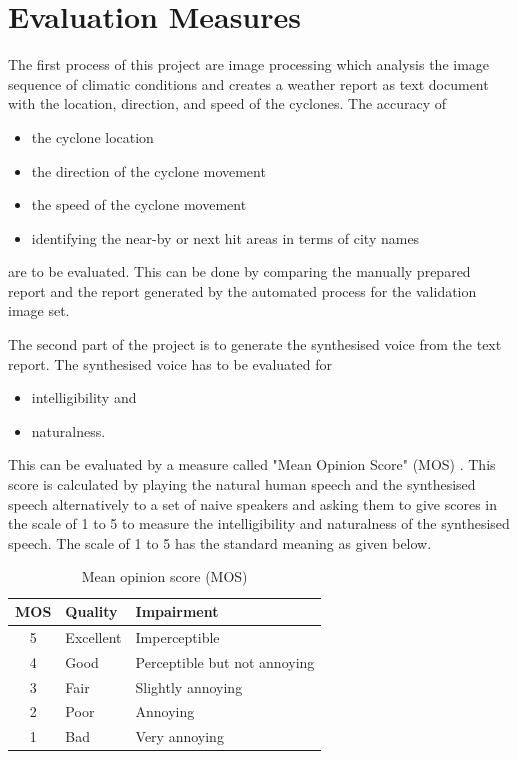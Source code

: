 \documentclass{article}
\begin{document}
\section{Evaluation Measures}
\label{sec:evalMeasures}
The first process of this project are image processing which analysis the image sequence
of climatic conditions and creates a weather report as text document with the location, direction, and speed of the cyclones. The accuracy of 
\begin{itemize}
\item the cyclone location
\item the direction of the cyclone movement
\item the speed of the cyclone movement
\item identifying the near-by or next hit areas in terms of city names
\end{itemize} are to be evaluated. This can be done by comparing the manually prepared report and the report generated by the automated process for the validation image set.

The second part of the project is to generate the synthesised voice from the text report. The synthesised voice has to be evaluated for 
\begin{itemize} 
\item intelligibility and 
\item naturalness.
\end{itemize} 
This can be evaluated by a measure called "Mean Opinion Score" (MOS) \cite{mos}.
This score is calculated by playing the natural human speech and the synthesised speech alternatively to a set of naive speakers and asking them to give scores in the scale of 1 to 5 to measure the intelligibility and naturalness of the synthesised speech. The scale of 1 to 5 has the standard meaning as given below.
\begin{table}[h]
\centering
\begin{tabular}{|c|l|l|}
\hline 
{\bf MOS	} & {\bf Quality } & {\bf Impairment} \\
\hline
5 & Excellent	& Imperceptible \\
4	& Good	& Perceptible but not annoying \\
3	& Fair	& Slightly annoying \\
2	& Poor	& Annoying \\
1	& Bad	& Very annoying \\ 
\hline 
\end{tabular}
\vspace{2mm}
\caption{Mean opinion score (MOS)}
\label{tab:mosDefn}
\end{table}
\end{document}

